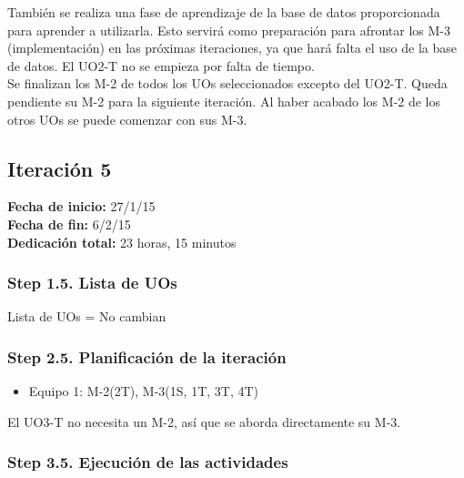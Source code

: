 También se realiza una fase de aprendizaje de la base de datos proporcionada para aprender a utilizarla. Esto servirá como preparación para afrontar los M-3 (implementación) en las próximas iteraciones, ya que hará falta el uso de la base de datos. El UO2-T no se empieza por falta de tiempo.\\

Se finalizan los M-2 de todos los UOs seleccionados excepto del UO2-T. Queda pendiente su M-2 para la siguiente iteración. Al haber acabado los M-2 de los otros UOs se puede comenzar con sus M-3.\\


\subsection{Iteración 5}
\label{it5}

\begin{flushleft}
\textbf{Fecha de inicio:} 27/1/15\\
\textbf{Fecha de fin:} 6/2/15\\
\textbf{Dedicación total:} 23 horas, 15 minutos\\
\end{flushleft}

\subsubsection{Step 1.5. Lista de UOs}
\label{it5:1.5}

Lista de UOs = No cambian

\subsubsection{Step 2.5. Planificación de la iteración}
\label{it5:2.5}

\begin{itemize}
\item Equipo 1: M-2(2T), M-3(1S, 1T, 3T, 4T)
\end{itemize}

El UO3-T no necesita un M-2, así que se aborda directamente su M-3.\\

\subsubsection{Step 3.5. Ejecución de las actividades}
\label{it5:3.5}


